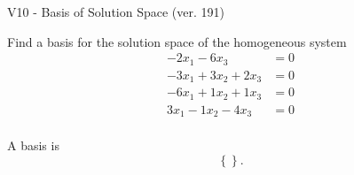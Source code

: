 \begin{exercise}
  \begin{exerciseTitle}V10 - Basis of Solution Space (ver. 191)\end{exerciseTitle}
  \begin{exerciseStatement}
    Find a basis for the solution space of the homogeneous system 
\begin{align*}
 -2 x_ 1 -6 x_ 3 &= 0  \\ 
  -3 x_ 1 + 3 x_ 2 + 2 x_ 3 &= 0  \\ 
  -6 x_ 1 + 1 x_ 2 + 1 x_ 3 &= 0  \\ 
  3 x_ 1 -1 x_ 2 -4 x_ 3 &= 0  \\ 
 \end{align*}


 
  \end{exerciseStatement}

  \begin{exerciseAnswer}
   A basis is   
\[\left\{\right\}.\]

  


  \end{exerciseAnswer}
\end{exercise}